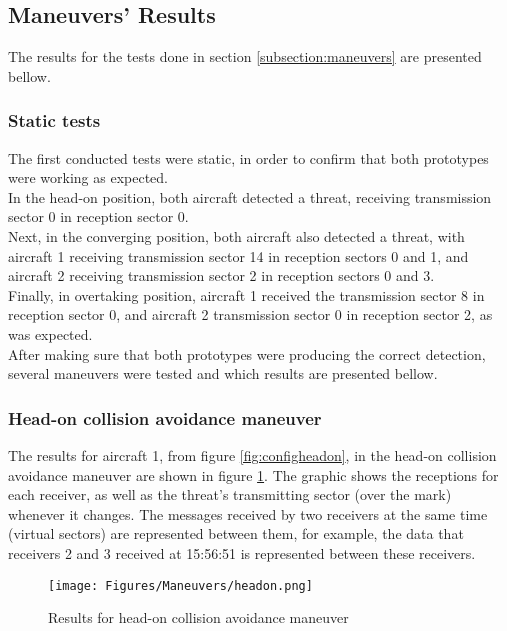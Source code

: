 \subsection{Maneuvers' Results}
\label{subsection:maneuversresults}
The results for the tests done in section \ref{subsection:maneuvers} are presented bellow.\\
\subsubsection{Static tests}
The first conducted tests were static, in order to confirm that both prototypes were working as expected.\\
In the head-on position, both aircraft detected a threat, receiving transmission sector 0 in reception sector 0.\\
Next, in the converging position, both aircraft also detected a threat, with aircraft 1 receiving transmission sector 14 in reception sectors 0 and 1, and aircraft 2 receiving transmission sector 2 in reception sectors 0 and 3.\\
Finally, in overtaking position, aircraft 1 received the transmission sector 8 in reception sector 0, and aircraft 2 transmission sector 0 in reception sector 2, as was expected.\\

After making sure that both prototypes were producing the correct detection, several maneuvers were tested and which results are presented bellow.\\
\subsubsection{Head-on collision avoidance maneuver}
The results for aircraft 1, from figure \ref{fig:configheadon}, in the head-on collision avoidance maneuver are shown in figure \ref{fig:resultsheadon}. The graphic shows the receptions for each receiver, as well as the threat's transmitting sector (over the mark) whenever it changes. The messages received by two receivers at the same time (virtual sectors) are represented between them, for example, the data that receivers 2 and 3 received at 15:56:51 is represented between these receivers.\\

\begin{figure}[!ht]
  \centering
  \texttt{[image: Figures/Maneuvers/headon.png]}
  \caption[Results for Head-On Collision Avoidance Maneuver]{Results for head-on collision avoidance maneuver}
  \label{fig:resultsheadon}
\end{figure}

